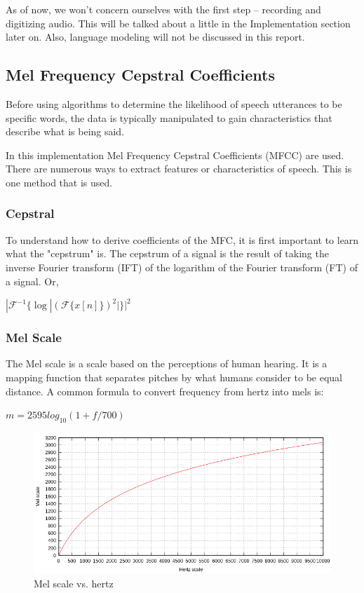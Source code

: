 \documentclass{article}
\begin{document}
As of now, we won't concern ourselves with the first step -- recording and digitizing audio. This will be talked about a little in the Implementation section later on. Also, language modeling will not be discussed in this report.
\subsection{Mel Frequency Cepstral Coefficients}
Before using algorithms to determine the likelihood of speech utterances to be specific words, the data is typically manipulated to gain characteristics that describe what is being said.

In this implementation Mel Frequency Cepstral Coefficients (MFCC) are used. There are numerous ways to extract features or characteristics of speech. This is one method that is used.

\subsubsection{Cepstral}
To understand how to derive coefficients of the MFC, it is first important to learn what the "cepstrum" is. The cepstrum of a signal is the result of taking the inverse Fourier transform (IFT) of the logarithm of the Fourier transform (FT) of a signal. Or,

\begin{center}
$|\mathcal{F}^{-1}\{\log|(\mathcal{F}\{x[n]\})^{2}|\}|^{2}$    
\end{center}

\subsubsection{Mel Scale}
The Mel scale is a scale based on the perceptions of human hearing. It is a mapping function that separates pitches by what humans consider to be equal distance. A common formula to convert frequency from hertz into mels is:

\begin{center}
    $m=2595log_{10}(1+f/700)$
\end{center}

\begin{figure}[H]
    \centering
    \includegraphics[width=\linewidth]{melscale.png}
    \caption{Mel scale vs. hertz}
    \label{fig:melscale}
\end{figure}
\end{document}
